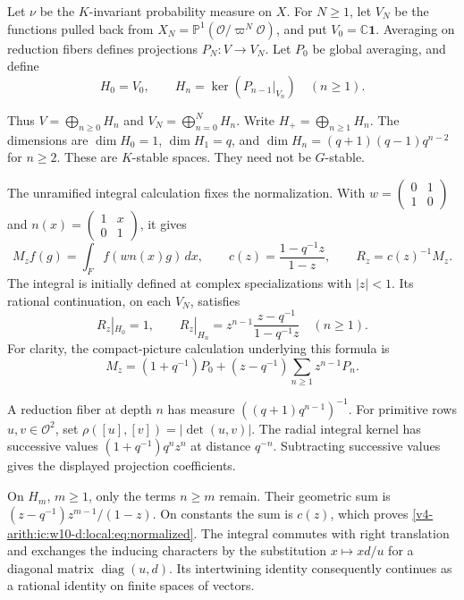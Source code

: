 Let $\nu$ be the $K$-invariant probability measure on $X$.
For $N\ge1$, let $V_N$ be the functions pulled back from
$X_N=\mathbb P^1(\mathcal O/\varpi^N\mathcal O)$, and put $V_0=\mathbb C\mathbf1$.
Averaging on reduction fibers defines projections $P_N:V\to V_N$.
Let $P_0$ be global averaging, and define
\[
 H_0=V_0,\qquad H_n=\ker(P_{n-1}|_{V_n})\quad(n\ge1).
\]

Thus $V=\bigoplus_{n\ge0}H_n$ and $V_N=\bigoplus_{n=0}^N H_n$.
Write $H_+=\bigoplus_{n\ge1}H_n$.
The dimensions are $\dim H_0=1$, $\dim H_1=q$, and
$\dim H_n=(q+1)(q-1)q^{n-2}$ for $n\ge2$.
These are $K$-stable spaces.
They need not be $G$-stable.

The unramified integral calculation fixes the normalization.
With
$w=\left(\begin{smallmatrix}0&1\\1&0\end{smallmatrix}\right)$ and
$n(x)=\left(\begin{smallmatrix}1&x\\0&1\end{smallmatrix}\right)$, it gives
\[
 M_zf(g)=\int_F f(wn(x)g)\,dx,\qquad
 c(z)=\frac{1-q^{-1}z}{1-z},\qquad R_z=c(z)^{-1}M_z.
\]
The integral is initially defined at complex specializations with $|z|<1$.
Its rational continuation, on each $V_N$, satisfies
\begin{equation}\label{v4-arith:ic:w10-d:local:eq:normalized}
 R_z|_{H_0}=1,\qquad
 R_z|_{H_n}=z^{n-1}\frac{z-q^{-1}}{1-q^{-1}z}\quad(n\ge1).
\end{equation}
For clarity, the compact-picture calculation underlying this formula is
\[
 M_z=(1+q^{-1})P_0+(z-q^{-1})\sum_{n\ge1}z^{n-1}P_n.
\]

A reduction fiber at depth $n$ has measure
$((q+1)q^{n-1})^{-1}$.
For primitive rows $u,v\in\mathcal O^2$, set $\rho([u],[v])=|\det(u,v)|$.
The radial integral kernel has successive values
$(1+q^{-1})q^nz^n$ at distance $q^{-n}$.
Subtracting successive values gives the displayed projection coefficients.

On $H_m$, $m\ge1$, only the terms $n\ge m$ remain.
Their geometric sum is $(z-q^{-1})z^{m-1}/(1-z)$.
On constants the sum is $c(z)$, which proves \eqref{v4-arith:ic:w10-d:local:eq:normalized}.
The integral commutes with right translation and exchanges the inducing characters
by the substitution $x\mapsto xd/u$ for a diagonal matrix $\operatorname{diag}(u,d)$.
Its intertwining identity consequently continues as a rational identity on finite spaces of vectors.

